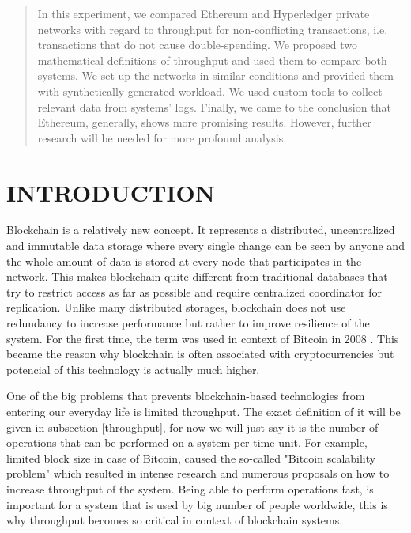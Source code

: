 \documentclass[12pt]{article}
\begin{document}

\tableofcontents
\pagebreak


\begin{abstract}
In this experiment, we compared Ethereum and Hyperledger private networks with regard to throughput for non-conflicting transactions, i.e. transactions that do not cause double-spending. We proposed two mathematical definitions of throughput and used them to compare both systems. We set up the networks in similar conditions and provided them with synthetically generated workload. We used custom tools to collect relevant data from systems’ logs. Finally, we came to the conclusion that Ethereum, generally, shows more promising results. However, further research will be needed for more profound analysis.
\end{abstract}

\newpage
\section{INTRODUCTION}

Blockchain is a relatively new concept. It represents a distributed, uncentralized and immutable data storage where every single change can be seen by anyone and the whole amount of data is stored at every node that participates in the network. This makes blockchain quite different from traditional databases that try to restrict access as far as possible and require centralized coordinator for replication. Unlike many distributed storages, blockchain does not use redundancy to increase performance but rather to improve resilience of the system. For the first time, the term was used in context of Bitcoin in 2008 \cite{bitcoin}. This became the reason why blockchain is often associated with cryptocurrencies but potencial of this technology is actually much higher.

One of the big problems that prevents blockchain-based technologies from entering our everyday life is limited throughput. The exact definition of it will be given in subsection \ref{throughput}, for now we will just say it is the number of operations that can be performed on a system per time unit. For example, limited block size in case of Bitcoin, caused the so-called "Bitcoin scalability problem" which resulted in intense research \cite{bitcoin_scaling} and numerous proposals on how to increase throughput of the system. Being able to perform operations fast, is important for a system that is used by big number of people worldwide, this is why throughput becomes so critical in context of blockchain systems.
\end{document}
